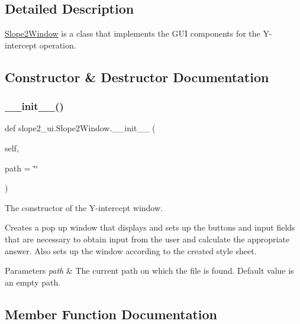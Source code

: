 \subsection{Detailed Description}
\hyperlink{classslope2__ui_1_1_slope2_window}{Slope2\+Window} is a class that implements the G\+UI components for the Y-\/intercept operation. 

\subsection{Constructor \& Destructor Documentation}
\mbox{\label{classslope2__ui_1_1_slope2_window_a99585670c54dbd059dea1c94f702dee5}} 
\subsubsection{\texorpdfstring{\+\_\+\+\_\+init\+\_\+\+\_\+()}{\_\_init\_\_()}}
{\footnotesize\ttfamily def slope2\+\_\+ui.\+Slope2\+Window.\+\_\+\+\_\+init\+\_\+\+\_\+ (\begin{DoxyParamCaption}\item[{}]{self,  }\item[{}]{path = {\ttfamily \char`\"{}\char`\"{}} }\end{DoxyParamCaption})}



The constructor of the Y-\/intercept window. 

Creates a pop up window that displays and sets up the buttons and input fields that are necessary to obtain input from the user and calculate the appropriate answer. Also sets up the window according to the created style sheet. 
\begin{DoxyParams}{Parameters}
{\em path} & The current path on which the file is found. Default value is an empty path. \\
\hline
\end{DoxyParams}


\subsection{Member Function Documentation}
\mbox{\label{classslope2__ui_1_1_slope2_window_a9aeddb429bd96a1fff389d2284195a4a}} 
